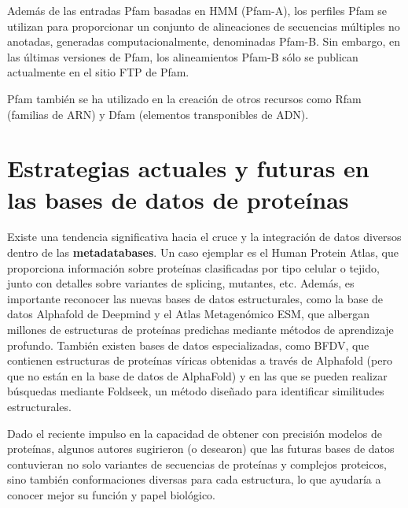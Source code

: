 Además de las entradas Pfam basadas en HMM (Pfam-A), los perfiles Pfam se utilizan para proporcionar un conjunto de alineaciones de secuencias múltiples no anotadas, generadas computacionalmente, denominadas Pfam-B. Sin embargo, en las últimas versiones de Pfam, los alineamientos Pfam-B sólo se publican actualmente en el sitio FTP de Pfam.

Pfam también se ha utilizado en la creación de otros recursos como Rfam (familias de ARN) y Dfam (elementos transponibles de ADN).

\section{Estrategias actuales y futuras en las bases de datos de proteínas}
Existe una tendencia significativa hacia el cruce y la integración de datos diversos dentro de las \textbf{metadatabases}. Un caso ejemplar es el Human Protein Atlas, que proporciona información sobre proteínas clasificadas por tipo celular o tejido, junto con detalles sobre variantes de splicing, mutantes, etc. Además, es importante reconocer las nuevas bases de datos estructurales, como la base de datos Alphafold de Deepmind y el Atlas Metagenómico ESM, que albergan millones de estructuras de proteínas predichas mediante métodos de aprendizaje profundo. También existen bases de datos especializadas, como BFDV, que contienen estructuras de proteínas víricas obtenidas a través de Alphafold (pero que no están en la base de datos de AlphaFold) y en las que se pueden realizar búsquedas mediante Foldseek, un método diseñado para identificar similitudes estructurales.

Dado el reciente impulso en la capacidad de obtener con precisión modelos de proteínas, algunos autores sugirieron (o desearon) que las futuras bases de datos contuvieran no solo variantes de secuencias de proteínas y complejos proteicos, sino también conformaciones diversas para cada estructura, lo que ayudaría a conocer mejor su función y papel biológico.
